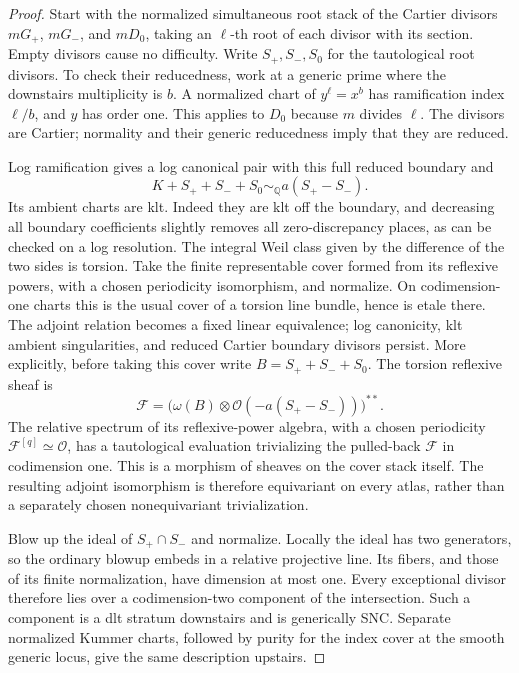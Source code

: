 \documentclass[11pt,letterpaper]{article}
\theoremstyle{definition}
\theoremstyle{remark}
\begin{document}
\begin{proof}
Start with the normalized simultaneous root stack of the Cartier
divisors $mG_+$, $mG_-$, and $mD_0$, taking an $\ell$-th root of
each divisor with its section.  Empty divisors cause no difficulty.
Write $S_+,S_-,S_0$ for the tautological root divisors.
To check their reducedness, work at a generic prime where the
downstairs multiplicity is $b$.  A normalized chart of
$y^\ell=x^b$ has ramification index $\ell/b$, and $y$ has order
one.  This applies to $D_0$ because $m$ divides $\ell$.
The divisors are Cartier; normality and their generic
reducedness imply that they are reduced.

Log ramification gives a log canonical pair with this full
reduced boundary and
\[
 K+S_++S_-+S_0\sim_{\mathbb{Q}}a(S_+-S_-).
\]
Its ambient charts are klt.  Indeed they are klt off the boundary,
and decreasing all boundary coefficients slightly removes all
zero-discrepancy places, as can be checked on a log resolution.
The integral Weil class given by the difference of the two
sides is torsion.  Take the finite representable cover formed
from its reflexive powers, with a chosen periodicity
isomorphism, and normalize.  On codimension-one charts this is
the usual cover of a torsion line bundle, hence is etale there.
The adjoint relation becomes a fixed linear equivalence;
log canonicity, klt ambient singularities, and reduced Cartier
boundary divisors persist.
More explicitly, before taking this cover write
$B=S_++S_-+S_0$.  The torsion reflexive sheaf is
\[
 \mathcal F=
 \bigl(\omega(B)\otimes\mathcal{O}(-a(S_+-S_-))\bigr)^{**}.
\]
The relative spectrum of its reflexive-power algebra, with a
chosen periodicity $\mathcal F^{[q]}\simeq\mathcal{O}$, has a
tautological evaluation trivializing the pulled-back
$\mathcal F$ in codimension one.  This is a morphism of
sheaves on the cover stack itself.  The resulting adjoint
isomorphism is therefore equivariant on every atlas, rather
than a separately chosen nonequivariant trivialization.

Blow up the ideal of $S_+\cap S_-$ and normalize.  Locally the
ideal has two generators, so the ordinary blowup embeds in a
relative projective line.  Its fibers, and those of its finite
normalization, have dimension at most one.  Every exceptional
divisor therefore lies over a codimension-two component of the
intersection.  Such a component is a dlt stratum downstairs and
is generically SNC.  Separate normalized Kummer charts, followed
by purity for the index cover at the smooth generic locus,
give the same description upstairs.


\end{proof}
\end{document}
